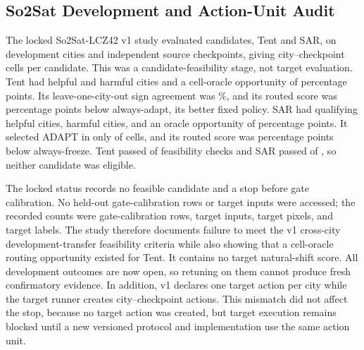 \subsection{So2Sat Development and Action-Unit Audit}
\label{app:so2sat-development}

The locked So2Sat-LCZ42 v1 study evaluated \SoTwoCandidateCount{} candidates, Tent and SAR, on
\SoTwoDevelopmentCityCount{} development cities and \SoTwoCheckpointCount{} independent source
checkpoints, giving \SoTwoCellCountPerCandidate{} city--checkpoint cells per candidate. This was a
candidate-feasibility stage, not target evaluation. Tent had \SoTwoTentHelpfulCityCount{} helpful and
\SoTwoTentHarmfulCityCount{} harmful cities and a cell-oracle opportunity of
\SoTwoTentOracleGainPP{} percentage points. Its leave-one-city-out sign agreement was
\SoTwoTentLocoSignPct{}\%, and its routed score was \SoTwoTentLossBestFixedPP{} percentage points
below always-adapt, its better fixed policy. SAR had \SoTwoSarHelpfulCityCount{} qualifying helpful
cities, \SoTwoSarHarmfulCityCount{} harmful cities, and an oracle opportunity of
\SoTwoSarOracleGainPP{} percentage points. It selected ADAPT in only \SoTwoSarAdaptCellCount{} of
\SoTwoCellCountPerCandidate{} cells, and its routed score was \SoTwoSarLossBestFixedPP{} percentage
points below always-freeze. Tent passed \SoTwoTentPassedCheckCount{} of
\SoTwoFeasibilityCheckCount{} feasibility checks and SAR passed \SoTwoSarPassedCheckCount{} of
\SoTwoFeasibilityCheckCount{}, so neither candidate was eligible.

The locked status records no feasible candidate and a stop before gate calibration. No held-out
gate-calibration rows or target inputs were accessed; the recorded counts were
\SoTwoGateCalRowsRead{} gate-calibration rows, \SoTwoTargetInputCount{} target inputs,
\SoTwoTargetPixelsRead{} target pixels, and \SoTwoTargetLabelsRead{} target labels. The study
therefore documents failure to meet the v1 cross-city development-transfer feasibility criteria
while also showing that a cell-oracle routing opportunity existed for Tent. It contains no target natural-shift
score. All \SoTwoOpenedOutcomeCount{}
development outcomes are now open, so retuning on them cannot produce fresh confirmatory evidence.
In addition, v1 declares one
target action per city while the target runner creates city--checkpoint actions. This mismatch did
not affect the stop, because no target action was created, but target execution remains blocked until
a new versioned protocol and implementation use the same action unit.

